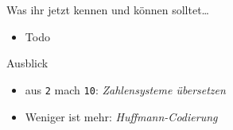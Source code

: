 \section{}
	\begin{frame}{Was ihr jetzt kennen und können solltet\dots}
			\begin{itemize}
				\item Todo
			\end{itemize}
	
	\end{frame}
	\begin{frame}{Ausblick}
		\begin{itemize}
			\item aus \texttt{2} mach \texttt{10}: \emph{Zahlensysteme übersetzen} 
			\item Weniger ist mehr: \emph{Huffmann-Codierung}
		\end{itemize}
	\end{frame}
\section{}
\questionframe
\lastframe
